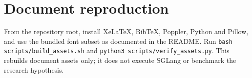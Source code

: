\documentclass[11pt,a4paper]{article}
\newcommand{\code}[1]{{\small\nolinkurl{#1}}}
\begin{document}
\section{Document reproduction}
From the repository root, install XeLaTeX, BibTeX, Poppler, Python and Pillow, and use the bundled font subset as documented in the README. Run \code{bash scripts/build_assets.sh} and \code{python3 scripts/verify_assets.py}. This rebuilds document assets only; it does not execute SGLang or benchmark the research hypothesis.


\end{document}

